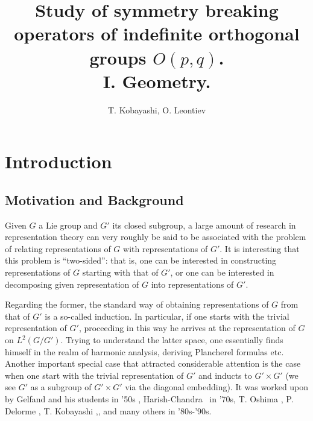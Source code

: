 \documentclass{article}
\numberwithin{definition}{section}
\numberwithin{lemma}{section}
\numberwithin{proposition}{section}
{\theorembodyfont{\rmfamily}\newtheorem{remark}{Remark}
\numberwithin{remark}{section}
}
\begin{document}
\title{Study of symmetry breaking operators of indefinite orthogonal groups $O( p, q)$.\\ 
I. Geometry.}
\author{T. Kobayashi, O. Leontiev}
\maketitle

{\tableofcontents}

\section{Introduction}

\subsection{Motivation and Background}

Given $G$ a Lie group and $G'$ its closed subgroup, a large amount of research
in representation theory can very roughly be said to be associated with the
problem of relating representations of $G$ with representations of $G'$. It is
interesting that this problem is ``two-sided'': that is, one can be interested
in constructing representations of $G$ starting with that of $G'$, or one can
be interested in decomposing given representation of $G$ into representations
of $G'$.

Regarding the former, the standard way of obtaining representations of $G$
from that of $G'$ is a so-called induction. In particular, if one starts with
the trivial representation of $G'$, proceeding in this way he arrives at the
representation of $G$ on $L^2 ( G / G')$. Trying to understand the latter
space, one essentially finds himself in the realm of harmonic analysis,
deriving Plancherel formulas etc. Another important special case that
attracted considerable attention is the case when one start with the trivial
representation of $G'$ and inducts to $G' \times G'$ (we see $G'$ as a
subgroup of $G' \times G'$ via the diagonal embedding). It was worked upon by
Gelfand and his students {\cite{gelfand1966generalized}} in '50s ,
Harish-Chandra {\cite{harishchandra1978harmonic}} \ in '70s, T. Oshima
{\cite{oshima1984description}}, P. Delorme {\cite{delorme1998plancherel}}, T.
Kobayashi
{\cite{kobayashi1994discrete1}},{\cite{kobayashi1998discrete2}},{\cite{kobayashi1998discrete3}}
and many others in '80s-'90s.
\end{document}
